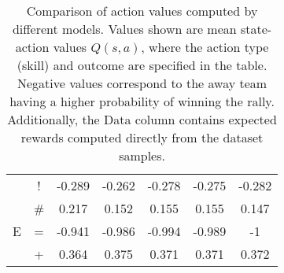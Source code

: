\documentclass{sfuthesis}
\begin{document}
\begin{table}
\begin{tabular}{ccccccc}
			& \multicolumn{1}{c|}{!}                & -0.289             & -0.262                & -0.278               & \multicolumn{1}{c|}{-0.275}              & -0.282        \\
			& \multicolumn{1}{c|}{\#}               & 0.217              & 0.152                 & 0.155                & \multicolumn{1}{c|}{0.155}               & 0.147         \\ \hline
			E              & \multicolumn{1}{c|}{=}                & -0.941             & -0.986                & -0.994               & \multicolumn{1}{c|}{-0.989}              & -1            \\
			& \multicolumn{1}{c|}{+}                & 0.364              & 0.375                 & 0.371                & \multicolumn{1}{c|}{0.371}               & 0.372        
		\end{tabular}
		\caption{Comparison of action values computed by different models. Values shown are mean state-action values $Q(s,a)$, where the action type (skill) and outcome are specified in the table. Negative values correspond to the away team having a higher probability of winning the rally. Additionally, the Data column contains expected rewards computed directly from the dataset samples.}
		\label{tab:qvalues_home}
	\end{table}
	
\end{document}
